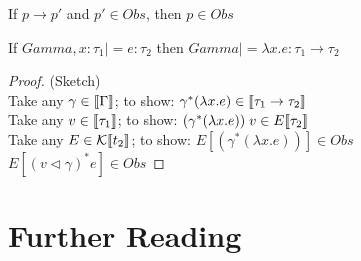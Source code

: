 \begin{lemma}
  If $p \longrightarrow p'$ and $p' \in Obs$, then $p \in Obs$
\end{lemma}

\begin{lemma}
  If $Gamma,x:\tau_1 |= e : \tau_2$ then $Gamma |= \lambda x.e : \tau_1 \to \tau_2$
\end{lemma}
\begin{proof}(Sketch)\\
  Take any $\gamma \in \llbracket\Gamma\rrbracket$;
    to show: $\gamma^*(\lambda x.e) \in \llbracket\tau_1 \to \tau_2\rrbracket$\\
  Take any $v \in \llbracket\tau_1\rrbracket$;
    to show: $(\gamma^* (\lambda x.e))\;v \in E\llbracket\tau_2\rrbracket$\\
  Take any $E \in \mathcal{K}\llbracket t_2\rrbracket$;
    to show: $E[(\gamma^* (\lambda x.e))] \in Obs$\\
  $E[(v \triangleleft \gamma)^* e] \in Obs$
\end{proof}

\section{Further Reading}
